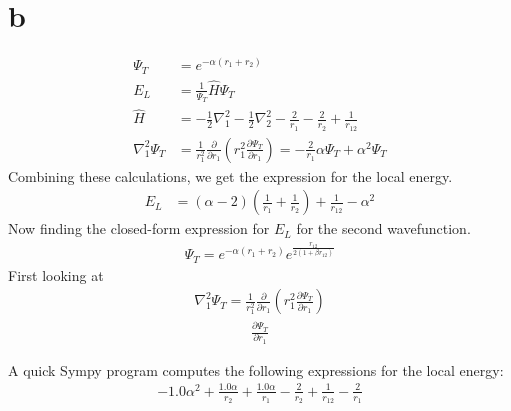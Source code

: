 \documentclass[a4paper, 12pt, titlepage]{article}
\begin{document}
\section*{b}
\begin{align*}
	\Psi_T &= e^{-\alpha(r_1 + r_2)} \\
	E_L &= \frac{1}{\Psi_T} \hat H \Psi_T \\
	\hat H &= -\frac{1}{2}\nabla_1^2 - \frac{1}{2}\nabla_2^2 - \frac{2}{r_1} - \frac{2}{r_2} + \frac{1}{r_{12}} \\
	\nabla_1^2 \Psi_T &= \frac{1}{r_1^2}\frac{\partial}{\partial r_1}\left(r_1^2 \frac{\partial \Psi_T}{\partial r_1}\right) = -\frac{2}{r_1}\alpha \Psi_T + \alpha^2\Psi_T
\end{align*}
Combining these calculations, we get the expression for the local energy. 
\begin{align*}
	E_L &= (\alpha - 2) \left( \frac{1}{r_1} + \frac{1}{r_2}\right) + \frac{1}{r_{12}} - \alpha^2
\end{align*}
Now finding the closed-form expression for $E_L$ for the second wavefunction. 
\begin{align*}
	\Psi_T = e^{-\alpha(r_1 + r_2)}e^{\frac{r_{12}}{2(1+\beta r_{12})}}
\end{align*}
First looking at
\begin{align*}
	\nabla_1^2 \Psi_T = \frac{1}{r_1^2}\frac{\partial}{\partial r_1}\left(r_1^2 \frac{\partial \Psi_T}{\partial r_1}\right)
\end{align*}
\begin{align*}
	\frac{\partial \Psi_T}{\partial r_1}
\end{align*}

A quick Sympy program computes the following expressions for the local energy:
\begin{align*}
- 1.0 \alpha^{2} + \frac{1.0 \alpha}{r_{2}} + \frac{1.0 \alpha}{r_{1}} - \frac{2}{r_{2}} + \frac{1}{r_{12}} - \frac{2}{r_{1}}\end{align*}
\end{document}
